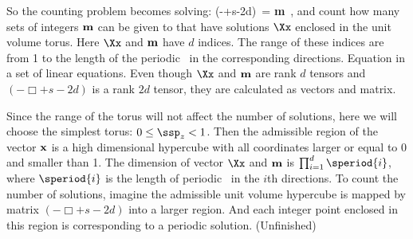 \begin{description}
{So the counting problem becomes solving:
\bea
 (-\Box +s-2d)\,{\bf \ssp} = {\bf m} \,,
\label{HLCountPeriodicBricks2}
\eea
and count how many sets of integers ${\bf m}$ can be given to
 that have solutions $\Xx$ enclosed in the unit
volume torus. Here $\Xx$ and ${\bf m}$ have $d$ indices. The range of these
indices are from 1 to the length of the periodic \brick\ in the corresponding
directions. Equation  in a set of linear equations.
Even though $\Xx$ and ${\bf m}$ are rank $d$ tensors and $(-\Box +s-2d)$ is a
rank $2d$ tensor, they are calculated as vectors and matrix.

Since the range of the torus will not affect the number of solutions, here we
will choose the simplest torus: $0 \leq \ssp_{z} <1$. Then the admissible region
of the vector $\bf x$ is a high dimensional hypercube with all coordinates larger
or equal to 0 and smaller than 1. The dimension of vector $\Xx$ and ${\bf m}$
is $\prod_{i=1}^{d} \speriod{i}$, where $\speriod{i}$ is the length of periodic
\brick\ in the $i$th directions. To count the number of solutions, imagine the
admissible unit volume hypercube is mapped by matrix $(-\Box +s-2d)$ into a
larger region. And each integer point enclosed in this region is corresponding to
a periodic solution. (Unfinished)
}

\end{description}
